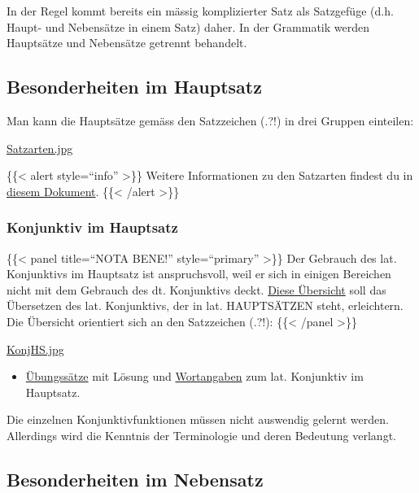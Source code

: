\documentclass{scrartcl}
\begin{document}
In der Regel kommt bereits ein mässig komplizierter Satz als
Satzgefüge (d.h. Haupt- und Nebensätze in einem Satz) daher. In der
Grammatik werden Hauptsätze und Nebensätze getrennt behandelt.

\subsection{Besonderheiten im Hauptsatz}
\label{sec:org2e805a1}

Man kann die Hauptsätze gemäss den Satzzeichen (.?!) in drei Gruppen
einteilen:

\href{file:///Users/aeneas/Dropbox/Hugo\_ArsGrammatica/content/grammatik/satzarten.jpg}{Satzarten.jpg}

\{\{< alert style="`info"' >\}\}
Weitere Informationen zu den Satzarten findest du in \href{https://www.dropbox.com/s/fskiu3e5rj485xp/Satzgrammatik.pdf?dl=0}{diesem Dokument}.
\{\{< /alert >\}\}

\subsubsection{Konjunktiv im Hauptsatz}
\label{sec:orge084a94}

\{\{< panel title="`NOTA BENE!"' style="`primary"' >\}\} Der Gebrauch des lat. Konjunktivs im Hauptsatz ist anspruchsvoll,
weil er sich in einigen Bereichen nicht mit dem Gebrauch des
dt. Konjunktivs deckt. \href{https://www.dropbox.com/s/k03cq5ysu5of1ha/KonjunktivHS.pdf?dl=0}{Diese Übersicht} soll das Übersetzen des
lat. Konjunktivs, der in lat. HAUPTSÄTZEN steht, erleichtern. Die
Übersicht orientiert sich an den Satzzeichen (.?!):
\{\{< /panel >\}\}


\href{file:///Users/aeneas/Dropbox/Hugo\_ArsGrammatica/content/grammatik/KonjHS.jpg}{KonjHS.jpg}

\begin{itemize}
\item \href{https://www.dropbox.com/s/sltkmozc04i5xwl/Konjunktiv.pdf?dl=0}{Übungssätze} mit Lösung und \href{https://www.dropbox.com/s/uicgeuj6n24kj97/Konjunktiv\_Wortangaben.pdf?dl=0}{Wortangaben} zum lat. Konjunktiv im
Hauptsatz.
\end{itemize}


Die einzelnen Konjunktivfunktionen müssen nicht auswendig gelernt werden.
Allerdings wird die Kenntnis der Terminologie und deren Bedeutung verlangt.


\subsection{Besonderheiten im Nebensatz}
\label{sec:org4be6171}
\end{document}
